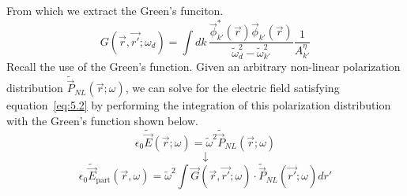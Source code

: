 \documentclass[12pt]{article}
\begin{document}
From which we extract the Green's funciton.
\begin{equation*}
G(\vec{r}, \vec{r'}; \omega_d) = \int dk \, \frac{\vec{\phi}_{k'}^*(\vec{r}) \vec{\phi}_{k'}(\vec{r})}{\tilde{\omega}_d^2 - \tilde{\omega}_{k'}^2} \frac{1}{A_{k'}^\eta}
\end{equation*}
Recall the use of the Green’s function. Given an arbitrary non-linear polarization distribution $\tilde{\vec{P}}_{NL} (\vec{r};\omega)$, we can solve for the electric field satisfying equation~\ref{eq:5.2} by performing the integration of this polarization distribution with the Green’s function shown below.
\begin{equation*}
[-\nabla^2-\tilde{\omega}^2 \epsilon^{(1)}(\vec{r})] \epsilon_0 \tilde{\vec{E}}(\vec{r};\omega)=\tilde{\omega}^2 \tilde{\vec{P}}_{NL}(\vec{r};\omega)
\end{equation*}
\begin{equation*}
\downarrow
\end{equation*}
\begin{equation*}
\epsilon_0\tilde{\vec{E}}_\text{part}(\vec{r},\omega)=\tilde{\omega}^2 \int \vec{G}(\vec{r},\vec{r'};\omega)\cdot \tilde{\vec{P}}_{NL} (\vec{r'};\omega)dr'
\end{equation*}
\end{document}
